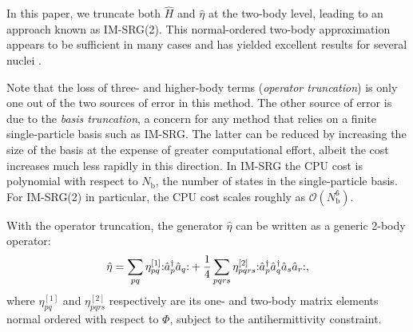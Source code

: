 In this paper, we truncate both $\hat{H}$ and $\hat{\eta}$ at the
two-body level, leading to an approach known as IM-SRG(2).  This
normal-ordered two-body approximation appears to be sufficient in many
cases and has yielded excellent results for several
nuclei \cite{PhysRevLett.106.222502,PhysRevLett.109.052501,IMSRG}.

Note that the loss of three- and higher-body terms (\textit{operator
truncation}) is only one out of the two sources of error in this
method.  The other source of error is due to the \textit{basis
truncation}, a concern for any method that relies on a finite
single-particle basis such as IM-SRG.  The latter can be reduced by
increasing the size of the basis at the expense of greater
computational effort, albeit the cost increases much less rapidly in
this direction.  In IM-SRG the CPU cost is polynomial with respect to
$N_{\mathrm{b}}$, the number of states in the single-particle basis.
For IM-SRG(2) in particular, the CPU cost scales roughly as
$\mathcal{O}(N_{\mathrm{b}}^6)$.

With the operator truncation, the generator $\hat{\eta}$ can be written as a generic 2-body operator:
\begin{align*}
\hat{\eta} = \sum_{p q} \eta_{p q}^{[1]} \mathopen: \hat a_p^\dagger \hat a_q \mathclose: +
\frac{1}{4} \sum_{p q r s}\eta_{p q r s}^{[2]} \mathopen: \hat a_p^\dagger \hat a_q^\dagger \hat a_s \hat a_r \mathclose:,
\end{align*}
where $\eta_{p q}^{[1]}$ and $ \eta_{p q r s}^{[2]}$ respectively are its one- and two-body matrix elements normal ordered with respect to $\Phi$, subject to the antihermittivity constraint.

